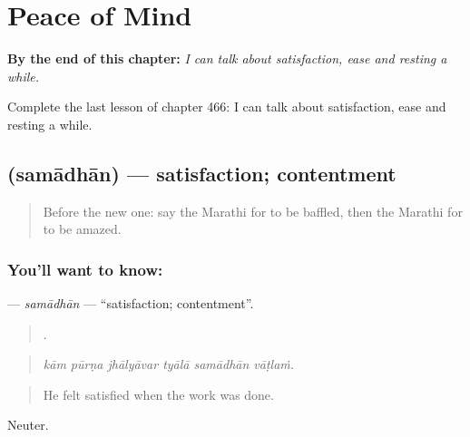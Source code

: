 
\chapter{Peace of Mind}
\label{ch:mr-peace-of-mind}

\begin{chapteropening}
\textbf{By the end of this chapter:} \emph{I can talk about satisfaction, ease and resting a while.}

Complete the last lesson of chapter 466: I can talk about satisfaction, ease and resting a while.
\end{chapteropening}

\section[\texorpdfstring{\mr{समाधान} (samādhān)}{समाधान (samādhān)}]{ (samādhān) — satisfaction; contentment}

\label{lesson:MR-C466-samadhan}



\begin{quote}
Before the new one: say the Marathi for to be baffled, then the Marathi for to be amazed.
\end{quote}

\subsection*{You'll want to know: }
\textbf{} — \emph{samādhān} — \textquotedblleft{}satisfaction; contentment\textquotedblright{}.

\begin{quote}
     .
\end{quote}

\begin{quote}
\emph{kām pūrṇa jhālyāvar tyālā samādhān vāṭlaṁ.}
\end{quote}

\begin{quote}
He felt satisfied when the work was done.
\end{quote}

Neuter.

